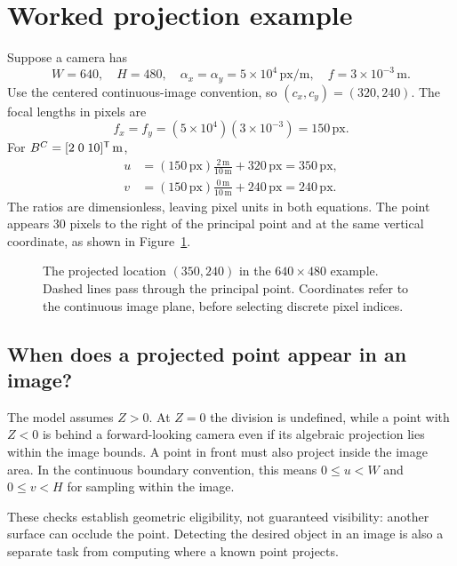 \section{Worked projection example}
Suppose a camera has
\[
 W=640,\quad H=480,\quad
 \alpha_x=\alpha_y=5\times10^4\,\mathrm{px/m},\quad
 f=3\times10^{-3}\,\mathrm m.
\]
Use the centered continuous-image convention, so $(c_x,c_y)=(320,240)$.
The focal lengths in pixels are
\[
 f_x=f_y=(5\times10^4)(3\times10^{-3})=150\,\mathrm{px}.
\]
For $B^C=[2\;0\;10]^{\mathsf T}\,\mathrm m$,
\begin{align}
 u&=(150\,\mathrm{px})\frac{2\,\mathrm m}{10\,\mathrm m}
       +320\,\mathrm{px}=350\,\mathrm{px},\\
 v&=(150\,\mathrm{px})\frac{0\,\mathrm m}{10\,\mathrm m}
       +240\,\mathrm{px}=240\,\mathrm{px}.
 \label{eq:l07-example}
\end{align}
The ratios are dimensionless, leaving pixel units in both equations. The
point appears 30 pixels to the right of the principal point and at the same
vertical coordinate, as shown in Figure~\ref{fig:l07-image}.

\begin{figure}[htbp]
\centering
\caption{The projected location $(350,240)$ in the $640\times480$ example.
Dashed lines pass through the principal point. Coordinates refer to the
continuous image plane, before selecting discrete pixel indices.}
\label{fig:l07-image}
\end{figure}

\subsection{When does a projected point appear in an image?}
The model assumes $Z>0$. At $Z=0$ the division is undefined, while a point
with $Z<0$ is behind a forward-looking camera even if its algebraic projection
lies within the image bounds. A point in front must also project inside the
image area. In the continuous boundary convention, this means
$0\le u<W$ and $0\le v<H$ for sampling within the image.

These checks establish geometric eligibility, not guaranteed visibility:
another surface can occlude the point. Detecting the desired object in an
image is also a separate task from computing where a known point projects.

